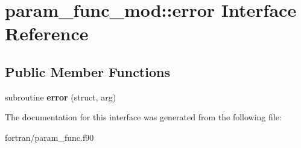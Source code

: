 \hypertarget{interfaceparam__func__mod_1_1error}{}\section{param\+\_\+func\+\_\+mod\+:\+:error Interface Reference}
\label{interfaceparam__func__mod_1_1error}
\subsection*{Public Member Functions}
\begin{DoxyCompactItemize}
\item 
\mbox{\label{interfaceparam__func__mod_1_1error_a75fb87ac02324e60535121b9933d0b7d}} 
subroutine {\bfseries error} (struct, arg)
\end{DoxyCompactItemize}


The documentation for this interface was generated from the following file\+:\begin{DoxyCompactItemize}
\item 
fortran/param\+\_\+func.\+f90\end{DoxyCompactItemize}
